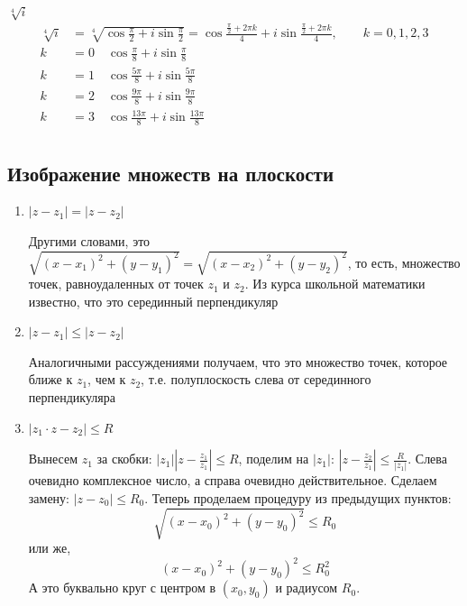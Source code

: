 \documentclass[12pt, a4paper]{article}
\begin{document}
    \begin{exmp}
        \( \sqrt[4]{i}  \)
        \begin{align*}
            \sqrt[4]{i} &= \sqrt[4]{\cos \frac{\pi}{2} + i \sin \frac{\pi}{2}}  = \cos \frac{\frac{\pi}{2} + 2 \pi k}{4} + i \sin \frac{\frac{\pi}{2} + 2 \pi k}{4}, \qquad k = 0, 1, 2, 3\\
            k &= 0 \quad \cos \frac{\pi}{8} + i \sin \frac{\pi}{8}\\
            k &= 1 \quad \cos \frac{5\pi}{8} + i \sin \frac{5\pi}{8}\\
            k &= 2 \quad \cos \frac{9\pi}{8} + i \sin \frac{9\pi}{8}\\
            k &= 3 \quad \cos \frac{13\pi}{8} + i \sin \frac{13\pi}{8}\\
        \end{align*}
    \end{exmp}
    \subsection{Изображение множеств на плоскости}
    \begin{enumerate}
        \item \( |z - z_{1}| = |z - z_{2}| \)

            Другими словами, это \( \sqrt{(x - x_{1})^2 + (y - y_{1})^2}  = \sqrt{(x - x_{2})^2 + (y - y_{2})^2}  \), то есть, множество точек, равноудаленных от точек \( z_{1} \) и \( z_{2} \). Из курса школьной математики известно, что это серединный перпендикуляр
            \begin{figure}[H]
            \end{figure}
        \item \( |z - z_{1}| \le |z - z_{2}| \)
            
            Аналогичными рассуждениями получаем, что это множество точек, которое ближе к \( z_{1} \), чем к \( z_{2} \), т.е. полуплоскость слева от серединного перпендикуляра
            \begin{figure}[H]
            \end{figure}
        \item \( |z_{1} \cdot z - z_{2}| \le R \)
            
            Вынесем \( z_{1} \) за скобки: \( |z_{1}| \left| z - \frac{z_{1}}{z_{1}} \right| \le  R \), поделим на \( |z_{1}| \): \( \left| z - \frac{z_{2}}{z_{1}} \right| \le \frac{R}{|z_{1}|}  \). Слева очевидно комплексное число, а справа очевидно действительное. Сделаем замену: \( |z - z_{0}| \le R_{0} \). Теперь проделаем процедуру из предыдущих пунктов: \[
                \sqrt{(x - x_{0})^2 + (y - y_{0})^2}  \le  R_{0}
            \] или же, \[
            (x - x_{0})^2 + (y - y_{0})^2 \le R_{0}^2
            \]   
            А это буквально круг с центром в \( (x_{0}, y_{0}) \) и радиусом \( R_{0} \).
    \end{enumerate}
\end{document}
